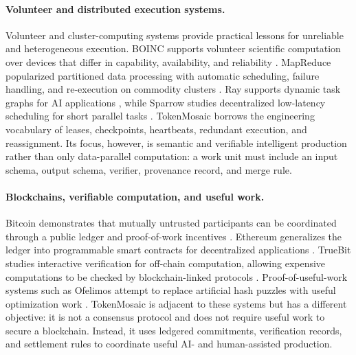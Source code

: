 \documentclass{article}
\theoremstyle{plain}
\begin{document}
\paragraph{Volunteer and distributed execution systems.}
Volunteer and cluster-computing systems provide practical lessons for unreliable and heterogeneous execution. BOINC supports volunteer scientific computation over devices that differ in capability, availability, and reliability \citep{anderson2020boinc}. MapReduce popularized partitioned data processing with automatic scheduling, failure handling, and re-execution on commodity clusters \citep{dean2004mapreduce}. Ray supports dynamic task graphs for AI applications \citep{moritz2018ray}, while Sparrow studies decentralized low-latency scheduling for short parallel tasks \citep{ousterhout2013sparrow}. TokenMosaic borrows the engineering vocabulary of leases, checkpoints, heartbeats, redundant execution, and reassignment. Its focus, however, is semantic and verifiable intelligent production rather than only data-parallel computation: a work unit must include an input schema, output schema, verifier, provenance record, and merge rule.

\paragraph{Blockchains, verifiable computation, and useful work.}
Bitcoin demonstrates that mutually untrusted participants can be coordinated through a public ledger and proof-of-work incentives \citep{nakamoto2008bitcoin}. Ethereum generalizes the ledger into programmable smart contracts for decentralized applications \citep{buterin2014ethereum}. TrueBit studies interactive verification for off-chain computation, allowing expensive computations to be checked by blockchain-linked protocols \citep{teutsch2019truebit}. Proof-of-useful-work systems such as Ofelimos attempt to replace artificial hash puzzles with useful optimization work \citep{fitzi2022ofelimos}. TokenMosaic is adjacent to these systems but has a different objective: it is not a consensus protocol and does not require useful work to secure a blockchain. Instead, it uses ledgered commitments, verification records, and settlement rules to coordinate useful AI- and human-assisted production.
\end{document}
